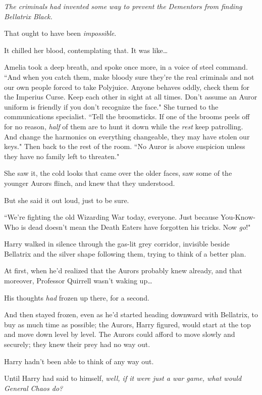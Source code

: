 \emph{The criminals had invented some way to prevent the Dementors from finding Bellatrix Black.}

That ought to have been \emph{impossible}.

It chilled her blood, contemplating that. It was like{\ldots}

Amelia took a deep breath, and spoke once more, in a voice of steel command. ``And when you catch them, make bloody sure they're the real criminals and not our own people forced to take Polyjuice. Anyone behaves oddly, check them for the Imperius Curse. Keep each other in sight at all times. Don't assume an Auror uniform is friendly if you don't recognize the face." She turned to the communications specialist. ``Tell the broomsticks. If one of the brooms peels off for no reason, \emph{half} of them are to hunt it down while the \emph{rest} keep patrolling. And change the harmonics on everything changeable, they may have stolen our keys." Then back to the rest of the room. ``No Auror is above suspicion unless they have no family left to threaten."

She saw it, the cold looks that came over the older faces, saw some of the younger Aurors flinch, and knew that they understood.

But she said it out loud, just to be sure.

``We're fighting the old Wizarding War today, everyone. Just because You-Know-Who is dead doesn't mean the Death Eaters have forgotten his tricks. Now \emph{go}!"

\later

Harry walked in silence through the gas-lit grey corridor, invisible beside Bellatrix and the silver shape following them, trying to think of a better plan.

At first, when he'd realized that the Aurors probably knew already, and that moreover, Professor Quirrell wasn't waking up{\ldots}

His thoughts \emph{had} frozen up there, for a second.

And then stayed frozen, even as he'd started heading downward with Bellatrix, to buy as much time as possible; the Aurors, Harry figured, would start at the top and move down level by level. The Aurors could afford to move slowly and securely; they knew their prey had no way out.

Harry hadn't been able to think of any way out.

Until Harry had said to himself, \emph{well, if it were just a war game, what would General Chaos do?}

